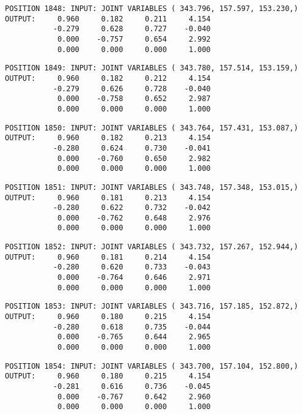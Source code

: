 \begin{verbatim}
POSITION 1848: INPUT: JOINT VARIABLES ( 343.796, 157.597, 153.230,)
OUTPUT:     0.960     0.182     0.211     4.154
           -0.279     0.628     0.727    -0.040
            0.000    -0.757     0.654     2.992
            0.000     0.000     0.000     1.000
\end{verbatim} \pagebreak[1]\begin{verbatim}
POSITION 1849: INPUT: JOINT VARIABLES ( 343.780, 157.514, 153.159,)
OUTPUT:     0.960     0.182     0.212     4.154
           -0.279     0.626     0.728    -0.040
            0.000    -0.758     0.652     2.987
            0.000     0.000     0.000     1.000
\end{verbatim} \pagebreak[1]\begin{verbatim}
POSITION 1850: INPUT: JOINT VARIABLES ( 343.764, 157.431, 153.087,)
OUTPUT:     0.960     0.182     0.213     4.154
           -0.280     0.624     0.730    -0.041
            0.000    -0.760     0.650     2.982
            0.000     0.000     0.000     1.000
\end{verbatim} \pagebreak[1]\begin{verbatim}
POSITION 1851: INPUT: JOINT VARIABLES ( 343.748, 157.348, 153.015,)
OUTPUT:     0.960     0.181     0.213     4.154
           -0.280     0.622     0.732    -0.042
            0.000    -0.762     0.648     2.976
            0.000     0.000     0.000     1.000
\end{verbatim} \pagebreak[1]\begin{verbatim}
POSITION 1852: INPUT: JOINT VARIABLES ( 343.732, 157.267, 152.944,)
OUTPUT:     0.960     0.181     0.214     4.154
           -0.280     0.620     0.733    -0.043
            0.000    -0.764     0.646     2.971
            0.000     0.000     0.000     1.000
\end{verbatim} \pagebreak[1]\begin{verbatim}
POSITION 1853: INPUT: JOINT VARIABLES ( 343.716, 157.185, 152.872,)
OUTPUT:     0.960     0.180     0.215     4.154
           -0.280     0.618     0.735    -0.044
            0.000    -0.765     0.644     2.965
            0.000     0.000     0.000     1.000
\end{verbatim} \pagebreak[1]\begin{verbatim}
POSITION 1854: INPUT: JOINT VARIABLES ( 343.700, 157.104, 152.800,)
OUTPUT:     0.960     0.180     0.215     4.154
           -0.281     0.616     0.736    -0.045
            0.000    -0.767     0.642     2.960
            0.000     0.000     0.000     1.000
\end{verbatim} \pagebreak[1]\begin{verbatim}

\end{verbatim}
